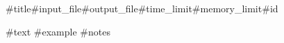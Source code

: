 \begin{problem}{#{title}}{#{input_file}}{#{output_file}}{#{time_limit}}{#{memory_limit}}{#{id}}

#{text}
#{example}
#{notes}
\end{problem}
